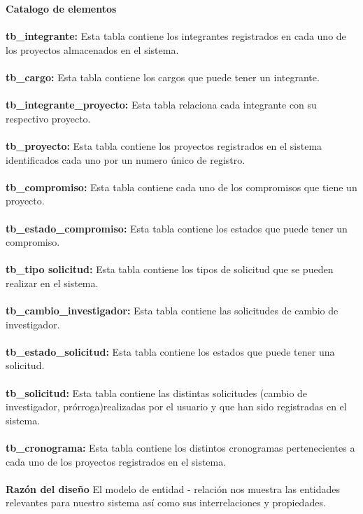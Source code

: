 \documentclass[12pt,oneside,letterpaper]{report}
\begin{document}
\textbf{Catalogo de elementos}\\
\\
\textbf{tb\_integrante:} Esta tabla contiene los integrantes registrados en cada uno de los proyectos almacenados en el sistema.\\
\\
\textbf{tb\_cargo:} Esta tabla contiene los cargos que puede tener un integrante.\\
\\
\textbf{tb\_integrante\_proyecto:} Esta tabla relaciona cada integrante con su respectivo proyecto.\\
\\
\textbf{tb\_proyecto:} Esta tabla contiene los proyectos registrados en el sistema identificados cada uno por un numero único de registro.\\
\\
\textbf{tb\_compromiso:} Esta tabla contiene cada uno de los compromisos que tiene un proyecto.\\
\\
\textbf{tb\_estado\_compromiso:} Esta tabla contiene los estados que puede tener un compromiso.\\
\\
\textbf{tb\_tipo solicitud:} Esta tabla contiene los tipos de solicitud que se pueden realizar en el sistema.\\
\\
\textbf{tb\_cambio\_investigador:} Esta tabla contiene las solicitudes de cambio de investigador.\\
\\
\textbf{tb\_estado\_solicitud:} Esta tabla contiene los estados que puede tener una solicitud.\\
\\
\textbf{tb\_solicitud:} Esta tabla contiene las distintas solicitudes (cambio de investigador, prórroga)realizadas por el usuario y que han sido registradas en el sistema.\\
\\
\textbf{tb\_cronograma:} Esta tabla contiene los distintos cronogramas pertenecientes a cada uno de los proyectos registrados en el sistema.\\
\\

\textbf{Razón del diseño}
El modelo de entidad - relación nos muestra las entidades relevantes para nuestro sistema así como sus  interrelaciones y propiedades.\\
\\
\end{document}
